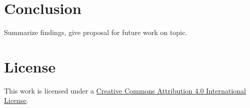\documentclass[12pt,a4paper]{article}
\begin{document}
\section{Conclusion}
Summarize findings, give proposal for future work on topic.




\section*{License}
\ccby\thinspace\thinspace This work is licensed under a \href{https://creativecommons.org/licenses/by/4.0/}{Creative Commons Attribution 4.0 International License}.
\end{document}
